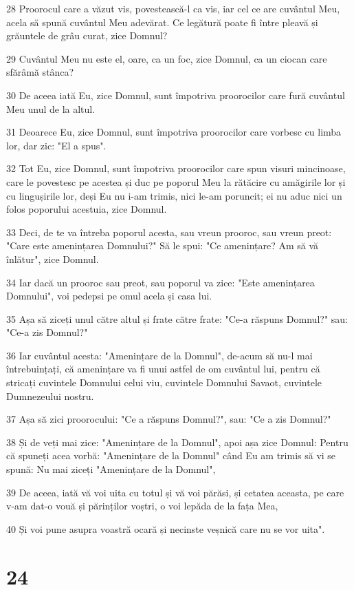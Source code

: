 \par 28 Proorocul care a văzut vis, povestească-l ca vis, iar cel ce are cuvântul Meu, acela să spună cuvântul Meu adevărat. Ce legătură poate fi între pleavă și grăuntele de grâu curat, zice Domnul?
\par 29 Cuvântul Meu nu este el, oare, ca un foc, zice Domnul, ca un ciocan care sfărâmă stânca?
\par 30 De aceea iată Eu, zice Domnul, sunt împotriva proorocilor care fură cuvântul Meu unul de la altul.
\par 31 Deoarece Eu, zice Domnul, sunt împotriva proorocilor care vorbesc cu limba lor, dar zic: "El a spus".
\par 32 Tot Eu, zice Domnul, sunt împotriva proorocilor care spun visuri mincinoase, care le povestesc pe acestea și duc pe poporul Meu la rătăcire cu amăgirile lor și cu lingușirile lor, deși Eu nu i-am trimis, nici le-am poruncit; ei nu aduc nici un folos poporului acestuia, zice Domnul.
\par 33 Deci, de te va întreba poporul acesta, sau vreun prooroc, sau vreun preot: "Care este amenințarea Domnului?" Să le spui: "Ce amenințare? Am să vă înlătur", zice Domnul.
\par 34 Iar dacă un prooroc sau preot, sau poporul va zice: "Este amenințarea Domnului", voi pedepsi pe omul acela și casa lui.
\par 35 Așa să ziceți unul către altul și frate către frate: "Ce-a răspuns Domnul?" sau: "Ce-a zis Domnul?"
\par 36 Iar cuvântul acesta: "Amenințare de la Domnul", de-acum să nu-l mai întrebuințați, că amenințare va fi unui astfel de om cuvântul lui, pentru că stricați cuvintele Domnului celui viu, cuvintele Domnului Savaot, cuvintele Dumnezeului nostru.
\par 37 Așa să zici proorocului: "Ce a răspuns Domnul?", sau: "Ce a zis Domnul?"
\par 38 Și de veți mai zice: "Amenințare de la Domnul", apoi așa zice Domnul: Pentru că spuneți acea vorbă: "Amenințare de la Domnul" când Eu am trimis să vi se spună: Nu mai ziceți "Amenințare de la Domnul",
\par 39 De aceea, iată vă voi uita cu totul și vă voi părăsi, și cetatea aceasta, pe care v-am dat-o vouă și părinților voștri, o voi lepăda de la fața Mea,
\par 40 Și voi pune asupra voastră ocară și necinste veșnică care nu se vor uita".

\chapter{24}

